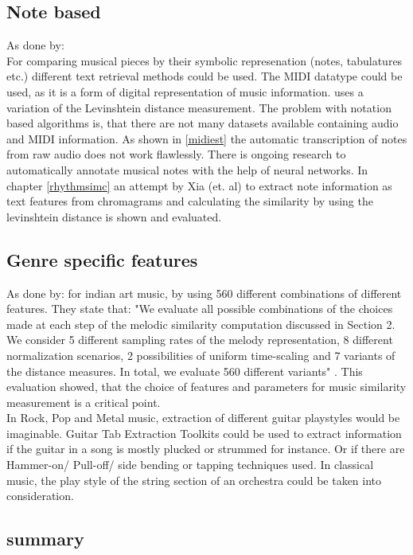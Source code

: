 \subsection{Note based}

As done by: \cite{midi1}\\
For comparing musical pieces by their symbolic represenation (notes, tabulatures etc.) different text retrieval methods could be used. The MIDI datatype could be used, as it is a form of digital representation of music information. 
\cite{midi1} uses a variation of the Levinshtein distance measurement. 
The problem with notation based algorithms is, that there are not many datasets available containing audio and MIDI information.
As shown in \ref{midiest} the automatic transcription of notes from raw audio does not work flawlessly. 
There is ongoing research to automatically annotate musical notes with the help of neural networks.\cite{crepe1}
In chapter \ref{rhythmsimc} an attempt by Xia (et. al) \cite{chroma4} to extract note information as text features from chromagrams and calculating the similarity by using the levinshtein distance is shown and evaluated.

\subsection{Genre specific features}

As done by: \cite{mussim1} for indian art music, by using 560 different combinations of different features. They state that: "We evaluate all possible combinations of the choices made at each step of the melodic similarity computation discussed in Section 2.  We consider 5 different sampling rates of the melody representation, 8 different normalization scenarios, 2 possibilities of uniform time-scaling and 7 variants of the distance measures.  In total, we evaluate 560 different variants" \cite[p. 3]{mussim1}. This evaluation showed, that the choice of features and parameters for music similarity measurement is a critical point.\\
In Rock, Pop and Metal music, extraction of different guitar playstyles would be imaginable. Guitar Tab Extraction \cite{guitext1} Toolkits could be used to extract information if the guitar in a song is mostly plucked or strummed for instance. Or if there are Hammer-on/ Pull-off/ side bending or tapping techniques used.
In classical music, the play style of the string section of an orchestra could be taken into consideration. 

\subsection{summary}

